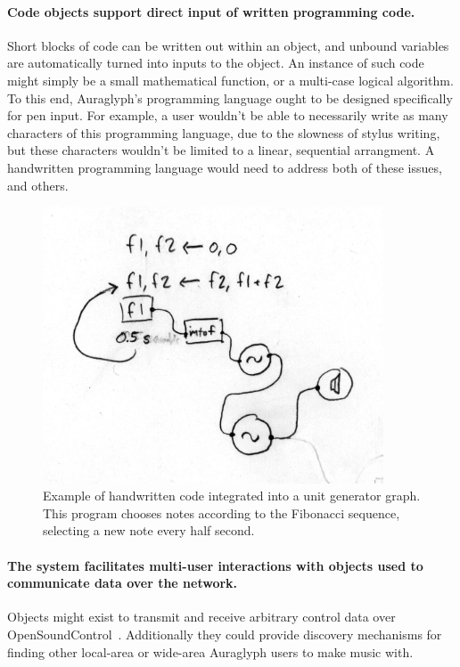 \documentclass[10pt,letterpaper]{article}
\begin{document}
\paragraph{Code objects support direct input of written programming code.} 
Short blocks of code can be written out within an object, and unbound variables are automatically turned into inputs to the object. 
An instance of such code might simply be a small mathematical function, or a multi-case logical algorithm. 
To this end, Auraglyph's programming language ought to be designed specifically for pen input. 
For example, a user wouldn't be able to necessarily write as many characters of this programming language, due to the slowness of stylus writing, but these characters wouldn't be limited to a linear, sequential arrangment. 
A handwritten programming language would need to address both of these issues, and others. 

\begin{figure}[h!]
	\centering
		\includegraphics[width=0.9\textwidth]{figures/HWCM-codeblock.jpeg}
	\caption{Example of handwritten code integrated into a unit generator graph. This program chooses notes according to the Fibonacci sequence, selecting a new note every half second. }
	\label{fig:auraglyphCode}
\end{figure}

\paragraph{The system facilitates multi-user interactions with objects used to communicate data over the network.} 
Objects might exist to transmit and receive arbitrary control data over OpenSoundControl~\cite{wright1997osc}. 
Additionally they could provide discovery mechanisms for finding other local-area or wide-area Auraglyph users to make music with. 
\end{document}

